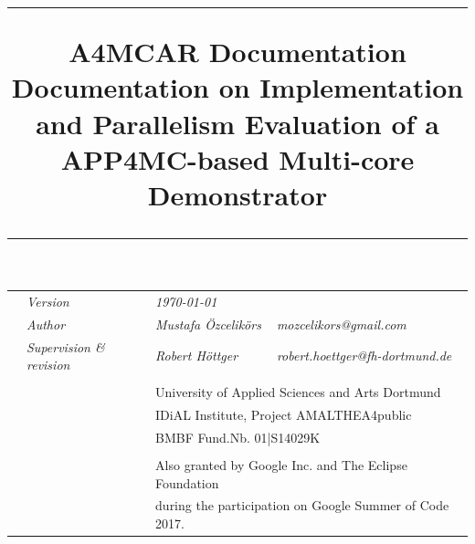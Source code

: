 





\title{\rule{\textwidth}{1pt}
	\textbf{ A4MCAR Documentation} \\ Documentation on Implementation and Parallelism Evaluation of a APP4MC-based Multi-core Demonstrator \rule{\textwidth}{1pt}\vspace{-20pt}}
\date{}

\maketitle 
\setlength{\headsep}{20pt}
\vspace{-20pt}
\hspace{-12pt}

\begin{tabularx}{\textwidth}{Xlll}
	& \textit{Version} & \textit{\today }&\\
	&\textit{Author} &\textit{Mustafa Özcelikörs} & \textit{mozcelikors@gmail.com}\\
	&\textit{Supervision \& revision} &\textit{Robert Höttger} &\textit{robert.hoettger@fh-dortmund.de}\\ \\
	
	&&\multicolumn{2}{l}{University of Applied Sciences and Arts Dortmund}\\ 
	&&\multicolumn{2}{l}{IDiAL Institute, Project AMALTHEA4public}\\
	&&\multicolumn{2}{l}{BMBF  	Fund.Nb. 01|S14029K}  \\ \\
	&&\multicolumn{2}{l}{Also granted by Google Inc. and The Eclipse Foundation}\\ 
	&&\multicolumn{2}{l}{during the participation on Google Summer of Code 2017.}\\
\end{tabularx} 
\vspace{15pt}\\

